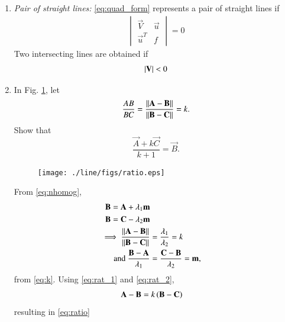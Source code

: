\begin{enumerate}[label=\arabic*.,ref=\thesubsection.\theenumi]
\item {\em Pair of straight lines:} \eqref{eq:quad_form}
%
represents a pair of straight lines if 
\begin{align}
\begin{vmatrix}
\vec{V}&\vec{u}
\\
\vec{u}^T&f
\end{vmatrix}
= 0
\end{align}
%
Two intersecting lines are obtained if 
\begin{align}
\left\vert\mathbf{V}\right\vert < 0
\end{align}
\item  In Fig. \ref{fig:ratio}, let
\begin{equation}
\frac{AB}{BC} = \frac{\left\lVert\mathbf{A}-\mathbf{B}\right\rVert}{\left\lVert\mathbf{B}-\mathbf{C}\right\rVert} = k.
\label{eq:k}
\end{equation}
%
Show that
\begin{equation}
\frac{\vec{A}+k\vec{C}}{k+1} = \vec{B}.
\label{eq:ratio}
\end{equation}
%
\solution
%
\begin{figure}[!hb]
\centering
\texttt{[image: ./line/figs/ratio.eps]}
\caption{}
\label{fig:ratio}
\end{figure}
From \eqref{eq:nhomog}, 
\begin{align}
\begin{split}
\mathbf{B} &= \mathbf{A} + \lambda_1 \mathbf{m}
\\
\mathbf{B} &= \mathbf{C} - \lambda_2 \mathbf{m}
\end{split}
\\
\label{eq:rat_1}
\implies \frac{\left\lVert\mathbf{A}-\mathbf{B}\right\rVert}{\left\lVert\mathbf{B}-\mathbf{C}\right\rVert} &= 
\frac{\lambda_1}{\lambda_2} = k
\\
\text{and } \frac{\mathbf{B}- \mathbf{A}}{\lambda_1} &= \frac{\mathbf{C}- 
\mathbf{B}}{\lambda_2} = \mathbf{m},
\label{eq:rat_2}
\end{align}
%
from \eqref{eq:k}. Using \eqref{eq:rat_1} and \eqref{eq:rat_2},
\begin{align}
\mathbf{A}- \mathbf{B} &=  k\left(\mathbf{B}- \mathbf{C}\right)
\end{align}
%
resulting in \eqref{eq:ratio}


\end{enumerate}
